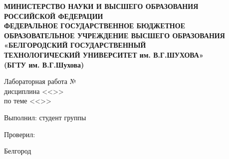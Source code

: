 \begin{titlepage}
\thispagestyle{empty}
\setlength{\parindent}{0ex} %

\begin{center}
  \textbf{МИНИСТЕРСТВО НАУКИ И ВЫСШЕГО ОБРАЗОВАНИЯ\\
РОССИЙСКОЙ ФЕДЕРАЦИИ\\
ФЕДЕРАЛЬНОЕ ГОСУДАРСТВЕННОЕ БЮДЖЕТНОЕ ОБРАЗОВАТЕЛЬНОЕ УЧРЕЖДЕНИЕ
ВЫСШЕГО ОБРАЗОВАНИЯ
«БЕЛГОРОДСКИЙ ГОСУДАРСТВЕННЫЙ\\
ТЕХНОЛОГИЧЕСКИЙ УНИВЕРСИТЕТ им. В.Г.ШУХОВА»\\
(БГТУ им. В.Г.Шухова)
}
\end{center}

\vspace{50mm}

\begin{center}
  Лабораторная работа № \LabNum \\
  дисциплина <<\LabSubject>>\\
  по теме <<\LabTheme>>\\
\end{center}

\vspace{40mm}

\begin{minipage}{.60\linewidth}
    Выполнил: студент группы \Group

    \smallskip

    Проверил:
\end{minipage}
\hfill
\begin{minipage}{.4\linewidth}
  \begin{flushright}
    \AuthorFIO

    \smallskip

    \LecturerFIO
  \end{flushright}
\end{minipage}

\vfill
\begin{center}
  Белгород \Year
\end{center}

\setlength{\parindent}{1.25cm} %
\end{titlepage}
